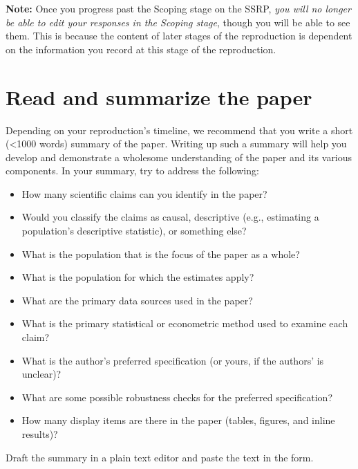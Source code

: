 \documentclass[
]{book}
\providecommand{\tightlist}{%
  \setlength{\itemsep}{0pt}\setlength{\parskip}{0pt}}
\begin{document}
\textbf{Note:} Once you progress past the Scoping stage on the SSRP, \emph{you will no longer be able to edit your responses in the Scoping stage}, though you will be able to see them. This is because the content of later stages of the reproduction is dependent on the information you record at this stage of the reproduction.

\hypertarget{read-sum}{%
\section{Read and summarize the paper}\label{read-sum}}

Depending on your reproduction's timeline, we recommend that you write a short (\textless1000 words) summary of the paper. Writing up such a summary will help you develop and demonstrate a wholesome understanding of the paper and its various components. In your summary, try to address the following:

\begin{itemize}
\tightlist
\item
  How many scientific claims can you identify in the paper?
\item
  Would you classify the claims as causal, descriptive (e.g., estimating a population's descriptive statistic), or something else?\\
\item
  What is the population that is the focus of the paper as a whole?\\
\item
  What is the population for which the estimates apply?\\
\item
  What are the primary data sources used in the paper?\\
\item
  What is the primary statistical or econometric method used to examine each claim?\\
\item
  What is the author's preferred specification (or yours, if the authors' is unclear)?\\
\item
  What are some possible robustness checks for the preferred specification?\\
\item
  How many display items are there in the paper (tables, figures, and inline results)?
\end{itemize}

Draft the summary in a plain text editor and paste the text in the form.
\end{document}
